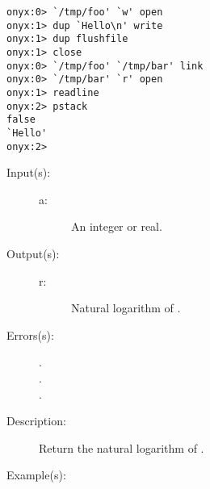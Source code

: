 \begin{description}
\begin{description}
\begin{verbatim}
onyx:0> `/tmp/foo' `w' open
onyx:1> dup `Hello\n' write
onyx:1> dup flushfile
onyx:1> close
onyx:0> `/tmp/foo' `/tmp/bar' link
onyx:0> `/tmp/bar' `r' open
onyx:1> readline
onyx:2> pstack
false
`Hello'
onyx:2>
		\end{verbatim}
	\end{description}
\label{systemdict:ln}
\item[{\onyxop{a}{ln}{r}}: ]
	\begin{description}\item[]
	\item[Input(s): ]
		\begin{description}\item[]
		\item[a: ]
			An integer or real.
		\end{description}
	\item[Output(s): ]
		\begin{description}\item[]
		\item[r: ]
			Natural logarithm of .
		\end{description}
	\item[Errors(s): ]
		\begin{description}\item[]
		\item[.]
		\item[.]
		\item[.]
		\end{description}
	\item[Description: ]
		Return the natural logarithm of .
	\item[Example(s): ]\begin{verbatim}


\end{verbatim}
\end{description}
\end{description}
